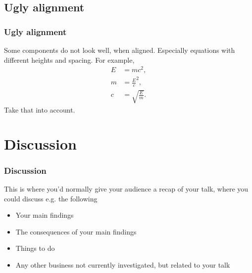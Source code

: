 \documentclass[aspectratio=169]{beamer}
\begin{document}
\subsection{Ugly alignment}
\begin{frame}
\frametitle{Ugly alignment}

Some components do not look well, when aligned. Especially equations with different heights and spacing. For example,
\begin{align}
E& = mc^2, \\
m& = \frac{E}{c}^2, \\
c& = \sqrt{\frac{E}{m}}. 
\end{align}
Take that into account.

\end{frame}

\section{Discussion}
\begin{frame}
\frametitle{Discussion}

This is where you’d normally give your audience a recap of your talk, where you could discuss e.g. the following
\begin{itemize}
  \item Your main findings
  \item The consequences of your main findings
  \item Things to do
  \item Any other business not currently investigated, but related to your talk
\end{itemize}

\end{frame}
\end{document}
